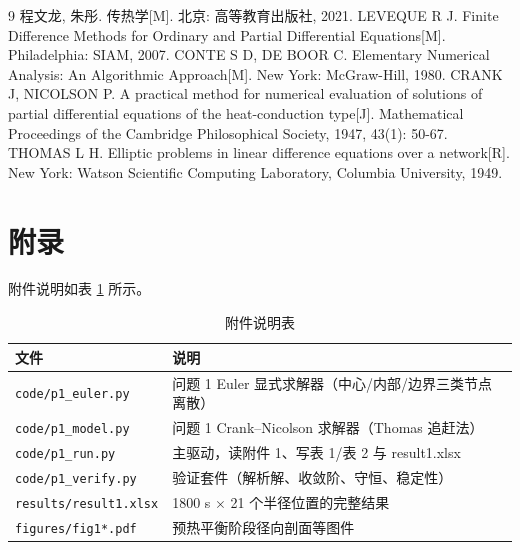 \documentclass[12pt,a4paper]{ctexart}
\begin{document}
\begin{thebibliography}{9}
 程文龙, 朱彤. 传热学[M]. 北京: 高等教育出版社, 2021.
 LEVEQUE R J. Finite Difference Methods for Ordinary and Partial Differential Equations[M]. Philadelphia: SIAM, 2007.
 CONTE S D, DE BOOR C. Elementary Numerical Analysis: An Algorithmic Approach[M]. New York: McGraw-Hill, 1980.
 CRANK J, NICOLSON P. A practical method for numerical evaluation of solutions of partial differential equations of the heat-conduction type[J]. Mathematical Proceedings of the Cambridge Philosophical Society, 1947, 43(1): 50-67.
 THOMAS L H. Elliptic problems in linear difference equations over a network[R]. New York: Watson Scientific Computing Laboratory, Columbia University, 1949.
\end{thebibliography}

\appendix
\section{附录}
附件说明如表 \ref{tab:appendix} 所示。

\begin{table}[H]
\centering
\caption{附件说明表}
\label{tab:appendix}
\begin{tabular}{ll}
\toprule
文件 & 说明 \\
\midrule
\texttt{code/p1\_euler.py} & 问题 1 Euler 显式求解器（中心/内部/边界三类节点离散） \\
\texttt{code/p1\_model.py} & 问题 1 Crank--Nicolson 求解器（Thomas 追赶法） \\
\texttt{code/p1\_run.py} & 主驱动，读附件 1、写表 1/表 2 与 result1.xlsx \\
\texttt{code/p1\_verify.py} & 验证套件（解析解、收敛阶、守恒、稳定性） \\
\texttt{results/result1.xlsx} & 1800 s $\times$ 21 个半径位置的完整结果 \\
\texttt{figures/fig1*.pdf} & 预热平衡阶段径向剖面等图件 \\
\bottomrule
\end{tabular}
\end{table}
\end{document}
